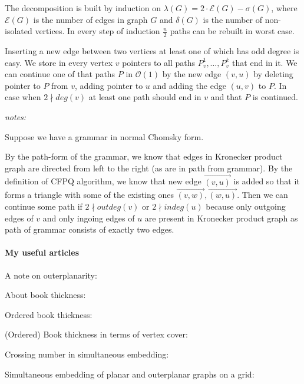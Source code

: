 The decomposition is built by induction on $\lambda(G) = 2 \cdot \mathcal{E}(G) - \sigma(G)$, where $\mathcal{E}(G)$ is the number of edges in graph $G$ and $\delta(G)$ is the number of non-isolated vertices. In every step of induction $\frac{n}{2}$ paths can be rebuilt in worst case. 


Inserting a new edge between two vertices at least one of which has odd degree is easy. We store in every vertex $v$ pointers to all paths $P_v^1, \ldots, P_v^k$ that end in it. We can continue one of that paths $P$ in $\mathcal{O}(1)$ by the new edge $(v, u)$ by deleting pointer to $P$ from $v$, adding pointer to $u$ and adding the edge $(u, v)$ to $P$. In case when $2 \nmid deg(v)$ at least one path should end in $v$ and that $P$ is continued.


\textit{notes:}

Suppose we have a grammar in normal Chomsky form.

By the path-form of the grammar, we know that edges in Kronecker product graph are directed from left to the right (as are in path from grammar). By the definition of CFPQ algorithm, we know that new edge $\overrightarrow{(v, u)}$ is added so that it forms a triangle with some of the existing ones $\overrightarrow{(v, w)},\overrightarrow{(w, u)}$. Then we can continue some path if $2 \nmid outdeg(v)$ or $2 \nmid indeg(u)$ because only outgoing edges of $v$ and only ingoing edges of $u$ are present in Kronecker product graph as path of grammar consists of exactly two edges.


\paragraph{My useful articles}

A note on outerplanarity: ~\cite{jha1993note}

About book thickness: ~\cite{bernhart1979book}

Ordered book thickness: ~\cite{10.1007/978-3-030-59267-7_35}

(Ordered) Book thickness in terms of vertex cover: ~\cite{bhore2019parameterized}

Crossing number in simultaneous embedding: ~\cite{crossing2009}

Simultaneous embedding of planar and outerplanar graphs on a grid: ~\cite{brass2007simultaneous}


